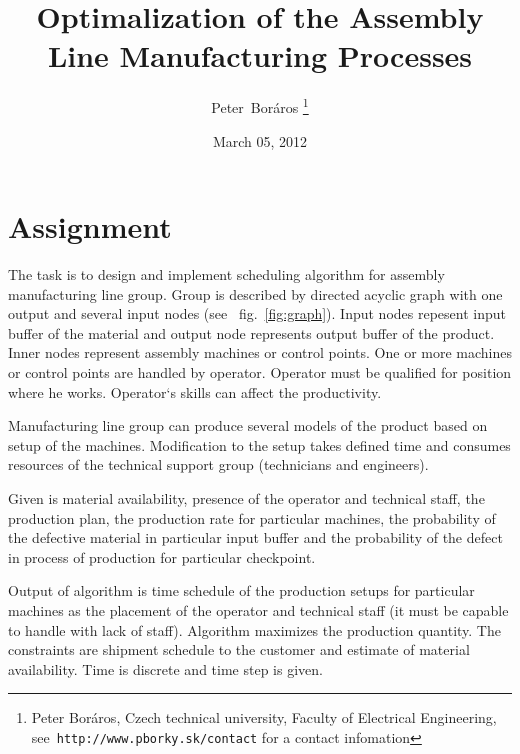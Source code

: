 \documentclass[a4paper,journal,onecolumn]{IEEEtran}
\begin{document}
\title{Optimalization of the Assembly Line Manufacturing Processes}
\date{March 05, 2012}
\author{Peter~Boráros %
\thanks{{Peter Boráros}, Czech technical university, Faculty of Electrical Engineering,
see~\texttt{http://www.pborky.sk/contact} for a contact infomation}}%




\maketitle
\IEEEdisplaynotcompsoctitleabstractindextext
\IEEEpeerreviewmaketitle

\section{Assignment}\label{ass}
The task is to design and implement scheduling algorithm for assembly manufacturing line group.
Group is described by directed acyclic graph with one output and several input nodes (see
~fig.~\ref{fig:graph}). Input nodes repesent input buffer of the material and output node represents
output buffer of the product. Inner nodes represent assembly machines or control points.
One or more machines or control points are handled by operator. Operator must be qualified for 
position where he works. Operator`s skills can affect the productivity.

Manufacturing line group can produce several models of the product based on setup of the 
machines. Modification to the setup takes defined time and consumes resources of the
technical support group (technicians and engineers).

Given is material availability, presence of the operator and technical staff, the production plan,
the production rate for particular machines, the probability of the defective material in 
particular input buffer and the probability of the defect in process of production for particular
checkpoint.

Output of algorithm is time schedule of the production setups for particular machines as the 
placement of the operator and technical staff (it must be capable to handle with lack of staff).
Algorithm maximizes the production quantity. The constraints are shipment schedule to
the customer and estimate of material availability. Time is discrete and time step is given.
\end{document}
